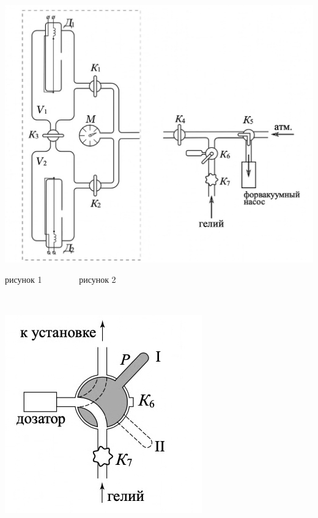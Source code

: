\begin{center}
\begin{minipage}{0.47\textwidth}
  \includegraphics[width=1\linewidth]{2.jpg}
  \begin{center}
  рисунок 1 \ \ \ \ \ \ \ \  рисунок 2
  \end{center}
\end{minipage}
\begin{minipage}{0.04\textwidth}
\
\end{minipage}
\begin{minipage}{0.4\textwidth}
  \begin{center}
 \includegraphics[width=0.5\linewidth]{3.jpg}\\


\end{center}
\end{minipage}
\end{center}
